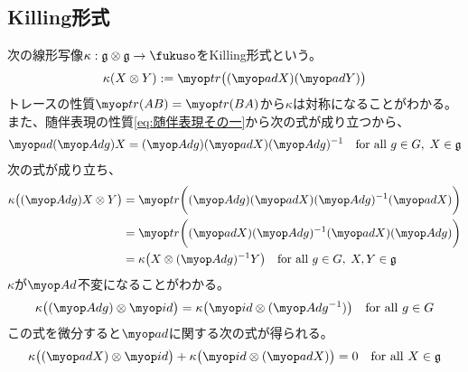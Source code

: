 {\subsection{Killing形式}\label{s2:Killing形式} %
	次の線形写像$\kappa:\frk{g}\otimes\frk{g}\to\fukuso$をKilling形式という。
	\begin{equation*}\begin{split}
		\kappa(X\otimes Y) := \tr\bigl((\ad X)(\ad Y)\bigr)
	\end{split}\end{equation*}
	トレースの性質$\tr(AB)=\tr(BA)$から$\kappa$は対称になることがわかる。
	また、随伴表現の性質\eqref{eq:随伴表現その一}から次の式が成り立つから、
	\begin{equation*}\begin{split}
		\ad(\Ad g)X = (\Ad g)(\ad X)(\Ad g)^{-1}
		\quad\text{for all } g\in G,\; X\in\frk{g}
	\end{split}\end{equation*}
	次の式が成り立ち、
	\begin{equation*}\begin{split}
		\kappa\bigl((\Ad g)X\otimes Y\bigr)
		&= \tr\biggl((\Ad g)(\ad X)(\Ad g)^{-1}(\ad X)\biggr) \\
		&= \tr\biggl((\ad X)(\Ad g)^{-1}(\ad X)(\Ad g)\biggr) \\
		&= \kappa\bigl(X\otimes (\Ad g)^{-1}Y\bigr)
			\quad\text{for all } g\in G,\; X,Y\in\frk{g} \\
	\end{split}\end{equation*}
	$\kappa$が$\Ad$不変になることがわかる。
	\begin{equation*}\begin{split}
		\kappa\bigl((\Ad g)\otimes\id\bigr)
		= \kappa\bigl(\id\otimes(\Ad g^{-1})\bigr)
		\quad\text{for all } g\in G
	\end{split}\end{equation*}
	この式を微分すると$\ad$に関する次の式が得られる。
	\begin{equation*}\begin{split}
		\kappa\bigl((\ad X)\otimes\id\bigr)
		+ \kappa\bigl(\id\otimes(\ad X)\bigr) = 0
		\quad\text{for all } X\in \frk{g}
	\end{split}\end{equation*}

}
